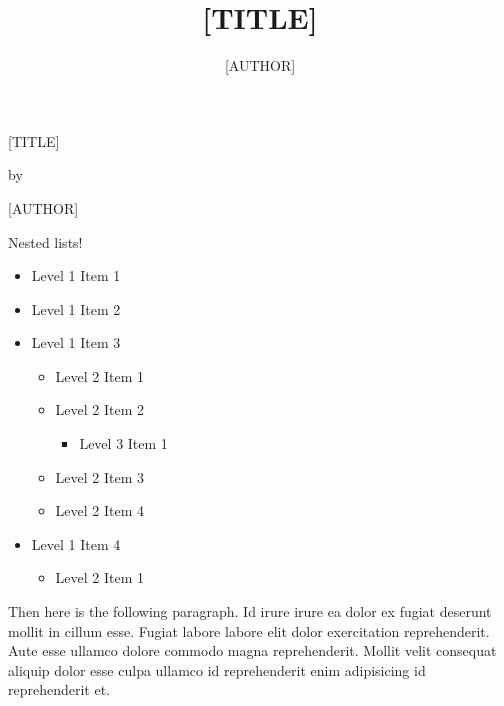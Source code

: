 \documentclass[
    12pt,
    letterpaper,
    oneside,
    noraggedright
]{turabian-researchpaper}
\title{{{[}TITLE{]}}}
\author{{{[}AUTHOR{]}}}
\makeatletter
\providecommand{\tightlist}{%
    \ifthenelse{\equal{\the\@listdepth}{1}}
    {}
    {\vspace{-\baselineskip}}
}
\makeatother
\begin{document}
    \begin{center}

    \thispagestyle{empty}
    \vspace*{1in}
    \begin{singlespace}
        {{[}TITLE{]}}
        \end{singlespace}
    \vspace{2in - \baselineskip}

    by
    \vspace{2in - \baselineskip}

    {{[}AUTHOR{]}}

    \vspace{2in - \baselineskip}

    \end{center}
    \newpage
    \setcounter{page}{1}

Nested lists!

\begin{itemize}
\tightlist
\item
  Level 1 Item 1
\item
  Level 1 Item 2
\item
  Level 1 Item 3

  \begin{itemize}
  \tightlist
  \item
    Level 2 Item 1
  \item
    Level 2 Item 2

    \begin{itemize}
    \tightlist
    \item
      Level 3 Item 1
    \end{itemize}
  \item
    Level 2 Item 3
  \item
    Level 2 Item 4
  \end{itemize}
\item
  Level 1 Item 4

  \begin{itemize}
  \tightlist
  \item
    Level 2 Item 1
  \end{itemize}
\end{itemize}

Then here is the following paragraph. Id irure irure ea dolor ex fugiat
deserunt mollit in cillum esse. Fugiat labore labore elit dolor
exercitation reprehenderit. Aute esse ullamco dolore commodo magna
reprehenderit. Mollit velit consequat aliquip dolor esse culpa ullamco
id reprehenderit enim adipisicing id reprehenderit et.
\end{document}

